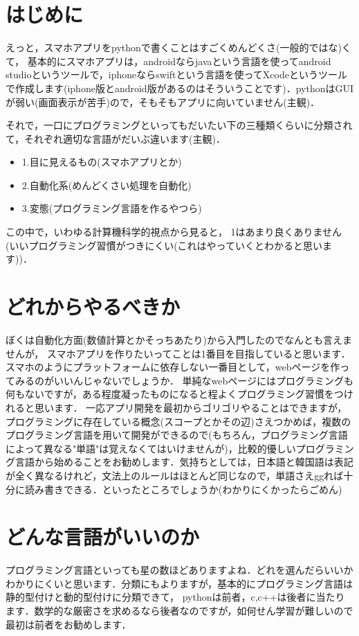 \documentclass[10pt,twocolumn]{jsarticle}
\begin{document}
\section{はじめに}


えっと，スマホアプリをpythonで書くことはすごくめんどくさ(一般的ではな)くて，
基本的にスマホアプリは，androidならjavaという言語を使ってandroid studioというツールで，iphoneならswiftという言語を使ってXcodeというツールで作成します(iphone版とandroid版があるのはそういうことです)．pythonはGUIが弱い(画面表示が苦手)ので，そもそもアプリに向いていません(主観)．

それで，一口にプログラミングといってもだいたい下の三種類くらいに分類されて，それぞれ適切な言語がだいぶ違います(主観)．

\begin{itemize}
  \item 1.目に見えるもの(スマホアプリとか)
  \item 2.自動化系(めんどくさい処理を自動化)
  \item 3.変態(プログラミング言語を作るやつら)
\end{itemize}



この中で，いわゆる計算機科学的視点から見ると，
1はあまり良くありません(いいプログラミング習慣がつきにくい(これはやっていくとわかると思います))．

\section{どれからやるべきか}
ぼくは自動化方面(数値計算とかそっちあたり)から入門したのでなんとも言えませんが，
スマホアプリを作りたいってことは1番目を目指していると思います．スマホのようにプラットフォームに依存しない一番目として，webページを作ってみるのがいいんじゃないでしょうか．
単純なwebページにはプログラミングも何もないですが，ある程度凝ったものになると程よくプログラミング習慣をつけれると思います．
一応アプリ開発を最初からゴリゴリやることはできますが，プログラミングに存在している概念(スコープとかその辺)さえつかめば，複数のプログラミング言語を用いて開発ができるので(もちろん，プログラミング言語によって異なる"単語"は覚えなくてはいけませんが)，比較的優しいプログラミング言語から始めることをお勧めします．気持ちとしては，日本語と韓国語は表記が全く異なるけれど，文法上のルールはほとんど同じなので，単語さえggれば十分に読み書きできる．といったところでしょうか(わかりにくかったらごめん)

\section{どんな言語がいいのか}
プログラミング言語といっても星の数ほどありますよね．どれを選んだらいいかわかりにくいと思います．分類にもよりますが，基本的にプログラミング言語は静的型付けと動的型付けに分類できて，
pythonは前者，c,c++は後者に当たります．数学的な厳密さを求めるなら後者なのですが，如何せん学習が難しいので最初は前者をお勧めします．
\end{document}
